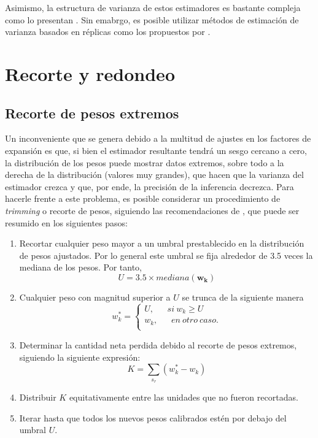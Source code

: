 \documentclass[
  12pt,
]{book}
\providecommand{\tightlist}{%
  \setlength{\itemsep}{0pt}\setlength{\parskip}{0pt}}
\begin{document}
Asimismo, la estructura de varianza de estos estimadores es bastante compleja como lo presentan \citet{Dever_Valliant_2016}. Sin emabrgo, es posible utilizar métodos de estimación de varianza basados en réplicas como los propuestos por \citet{Opsomer_Erciulescu_2022}.

\hypertarget{recorte-y-redondeo}{%
\section{Recorte y redondeo}\label{recorte-y-redondeo}}

\hypertarget{recorte-de-pesos-extremos}{%
\subsection{Recorte de pesos extremos}\label{recorte-de-pesos-extremos}}

Un inconveniente que se genera debido a la multitud de ajustes en los factores de expansión es que, si bien el estimador resultante tendrá un sesgo cercano a cero, la distribución de los pesos puede mostrar datos extremos, sobre todo a la derecha de la distribución (valores muy grandes), que hacen que la varianza del estimador crezca y que, por ende, la precisión de la inferencia decrezca. Para hacerle frente a este problema, es posible considerar un procedimiento de \emph{trimming} o recorte de pesos, siguiendo las recomendaciones de \citet[sec.~14.4]{Valliant_Dever_Kreuter_2018}, que puede ser resumido en los siguientes pasos:

\begin{enumerate}
\def\labelenumi{\arabic{enumi}.}
\tightlist
\item
  Recortar cualquier peso mayor a un umbral prestablecido en la distribución de pesos ajustados. Por lo general este umbral se fija alrededor de 3.5 veces la mediana de los pesos. Por tanto,
  \[
  U=3.5\times mediana(\mathbf{w_{k}})
  \]
\item
  Cualquier peso con magnitud superior a \(U\) se trunca de la siguiente manera
  \[
  w_k^\ast=\left\{\begin{matrix}U,\ \ \ \ \ \ \ si\ w_{k}\geq U\\
  w_{k},\ \ \ \ \ \ \ en\ otro\ caso.\\\end{matrix}\right.
  \]
\item
  Determinar la cantidad neta perdida debido al recorte de pesos extremos, siguiendo la siguiente expresión:
  \[
  K=\sum_{s_r}(w_k^\ast - w_{k})
  \]
\item
  Distribuir \(K\) equitativamente entre las unidades que no fueron recortadas.
\item
  Iterar hasta que todos los nuevos pesos calibrados estén por debajo del umbral \(U\).
\end{enumerate}
\end{document}
